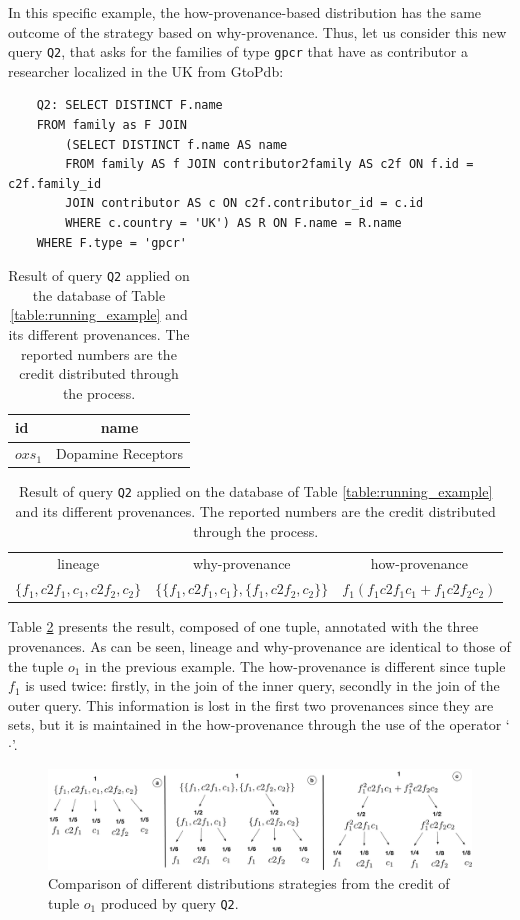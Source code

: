 In this specific example, the how-provenance-based distribution has the same outcome of the strategy based on why-provenance. %
Thus, let us consider this new query \texttt{Q2}, that asks for the families of type \texttt{gpcr} that have as contributor a researcher localized in the UK from GtoPdb:
\begin{verbatim}
	Q2: SELECT DISTINCT F.name 
	FROM family as F JOIN
		(SELECT DISTINCT f.name AS name
		FROM family AS f JOIN contributor2family AS c2f ON f.id = c2f.family_id
		JOIN contributor AS c ON c2f.contributor_id = c.id
		WHERE c.country = 'UK') AS R ON F.name = R.name
	WHERE F.type = 'gpcr'
\end{verbatim}

\begin{table}[]
\centering
  \begin{tabular}{|l|c|}
  \hline
    id & name\\
    \hline
    $oxs_1$ &  Dopamine Receptors\\
    \hline
  \end{tabular}
  \begin{tabular}{c | c | c}
  	lineage & why-provenance & how-provenance   \\
  	$\{f_1, c2f_1, c_1, c2f_2, c_2\}$ & $\{\{f_1, c2f_1, c_1\}, \{f_1, c2f_2, c_2\}\}$ & $f_1(f_1 c2f_1 c_1 + f_1 c2f_2 c_2)$\\
  \end{tabular}
    \caption{Result of query \texttt{Q2} applied on the database of Table \ref{table:running_example} and its different provenances. The reported numbers are the credit distributed through the process.}
  \label{table:difference_result}
\end{table}

Table \ref{table:difference_result} presents the result, composed of one tuple, annotated with the three provenances. As can be seen, lineage and why-provenance are identical to those of the tuple $o_1$ in the previous example. 
The how-provenance is different since tuple $f_1$ is used twice: firstly, in the join of the inner query, secondly in the join of the outer query. This information is lost in the first two provenances since they are sets, but it is maintained in the how-provenance through the use of the operator `$\cdot$'.

\begin{figure}[]
  \includegraphics[width=\textwidth]{figures/how_distribution}
  \caption{Comparison of different distributions strategies from the credit of tuple $o_1$ produced by query \texttt{Q2}.}
  \label{figure:distributions_differences}
\end{figure}


